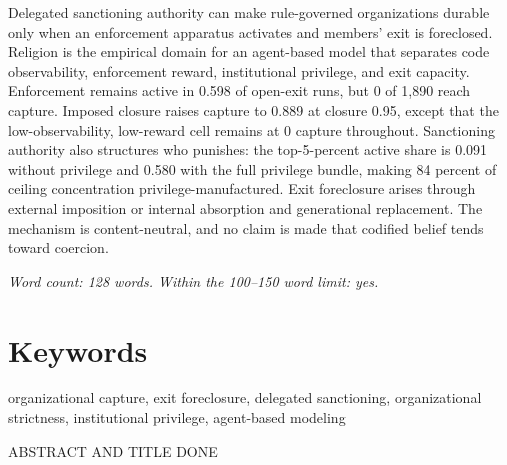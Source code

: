 Delegated sanctioning authority can make rule-governed organizations durable only when an enforcement apparatus activates and members' exit is foreclosed. Religion is the empirical domain for an agent-based model that separates code observability, enforcement reward, institutional privilege, and exit capacity. Enforcement remains active in 0.598 of open-exit runs, but 0 of 1,890 reach capture. Imposed closure raises capture to 0.889 at closure 0.95, except that the low-observability, low-reward cell remains at 0 capture throughout. Sanctioning authority also structures who punishes: the top-5-percent active share is 0.091 without privilege and 0.580 with the full privilege bundle, making 84 percent of ceiling concentration privilege-manufactured. Exit foreclosure arises through external imposition or internal absorption and generational replacement. The mechanism is content-neutral, and no claim is made that codified belief tends toward coercion.

\noindent\textit{Word count: 128 words. Within the 100--150 word limit: yes.}

\section*{Keywords}

organizational capture, exit foreclosure, delegated sanctioning, organizational strictness, institutional privilege, agent-based modeling

\bigskip
\noindent ABSTRACT AND TITLE DONE
